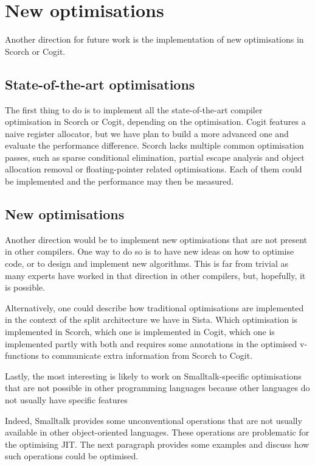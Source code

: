 \documentclass[a4paper,12pt,twoside]{../includes/ThesisStyle}
\begin{document}
\section{New optimisations}
\label{sec:newOpt}

Another direction for future work is the implementation of new optimisations in Scorch or Cogit. 

\subsection{State-of-the-art optimisations}

The first thing to do is to implement all the state-of-the-art compiler optimisation in Scorch or Cogit, depending on the optimisation. Cogit features a naive register allocator, but we have plan to build a more advanced one and evaluate the performance difference. Scorch lacks multiple common optimisation passes, such as sparse conditional elimination, partial escape analysis and object allocation removal or floating-pointer related optimisations. Each of them could be implemented and the performance may then be measured.

\subsection{New optimisations}

Another direction would be to implement new optimisations that are not present in other compilers. One way to do so is to have new ideas on how to optimise code, or to design and implement new algorithms. This is far from trivial as many experts have worked in that direction in other compilers, but, hopefully, it is possible.

Alternatively, one could describe how traditional optimisations are implemented in the context of the split architecture we have in Sista. Which optimisation is implemented in Scorch, which one is implemented in Cogit, which one is implemented partly with both and requires some annotations in the optimised v-functions to communicate extra information from Scorch to Cogit. 

Lastly, the most interesting is likely to work on Smalltalk-specific optimisations that are not possible in other programming languages because other languages do not usually have specific features

Indeed, Smalltalk provides some unconventional operations that are not usually available in other object-oriented languages. These operations are problematic for the optimising JIT. The next paragraph provides some examples and discuss how such operations could be optimised.
\end{document}

